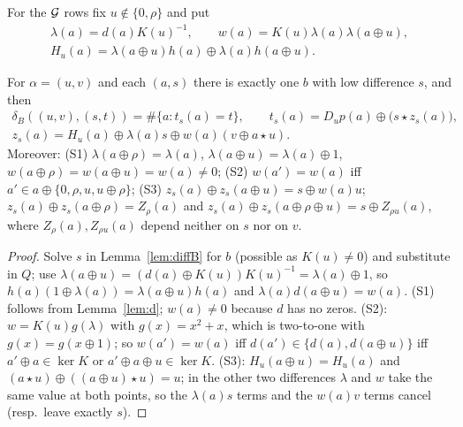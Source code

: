 For the $\mathcal{G}$ rows fix $u\notin\{0,\rho\}$ and put
\[
\begin{gathered}
\lambda(a)=d(a)K(u)^{-1},\qquad w(a)=K(u)\lambda(a)\lambda(a\oplus u),\\
H_u(a)=\lambda(a\oplus u)h(a)\oplus\lambda(a)h(a\oplus u).
\end{gathered}
\]
\begin{lemma}\label{lem:Grow}
For $\alpha=(u,v)$ and each $(a,s)$ there is exactly one $b$ with low difference $s$, and then
\begin{gather*}
\delta_B((u,v),(s,t))=\#\{a: t_s(a)=t\},\qquad t_s(a)=D_up(a)\oplus\bigl(s\star z_s(a)\bigr),\\
z_s(a)=H_u(a)\oplus\lambda(a)s\oplus w(a)(v\oplus a\star u).
\end{gather*}
Moreover:
\textup{(S1)} $\lambda(a\oplus\rho)=\lambda(a)$, $\lambda(a\oplus u)=\lambda(a)\oplus1$, $w(a\oplus\rho)=w(a\oplus u)=w(a)\ne0$;
\textup{(S2)} $w(a')=w(a)$ iff $a'\in a\oplus\{0,\rho,u,u\oplus\rho\}$;
\textup{(S3)} $z_s(a)\oplus z_s(a\oplus u)=s\oplus w(a)u$; $z_s(a)\oplus z_s(a\oplus\rho)=Z_\rho(a)$ and
$z_s(a)\oplus z_s(a\oplus\rho\oplus u)=s\oplus Z_{\rho u}(a)$, where $Z_\rho(a),Z_{\rho u}(a)$ depend neither on $s$ nor on $v$.
\end{lemma}
\begin{proof}
Solve $s$ in Lemma~\ref{lem:diffB} for $b$ (possible as $K(u)\ne0$) and substitute in $Q$; use
$\lambda(a\oplus u)=(d(a)\oplus K(u))K(u)^{-1}=\lambda(a)\oplus1$, so $h(a)(1\oplus\lambda(a))=\lambda(a\oplus u)h(a)$ and
$\lambda(a)d(a\oplus u)=w(a)$. (S1) follows from Lemma~\ref{lem:d}; $w(a)\ne0$ because $d$ has no zeros.
(S2): $w=K(u)g(\lambda)$ with $g(x)=x^2+x$, which is two-to-one with $g(x)=g(x\oplus1)$; so $w(a')=w(a)$ iff
$d(a')\in\{d(a),d(a\oplus u)\}$ iff $a'\oplus a\in\ker K$ or $a'\oplus a\oplus u\in\ker K$.
(S3): $H_u(a\oplus u)=H_u(a)$ and $(a\star u)\oplus((a\oplus u)\star u)=u$; in the other two differences
$\lambda$ and $w$ take the same value at both points, so the $\lambda(a)s$ terms and the $w(a)v$ terms cancel
(resp.\ leave exactly $s$).
\end{proof}

